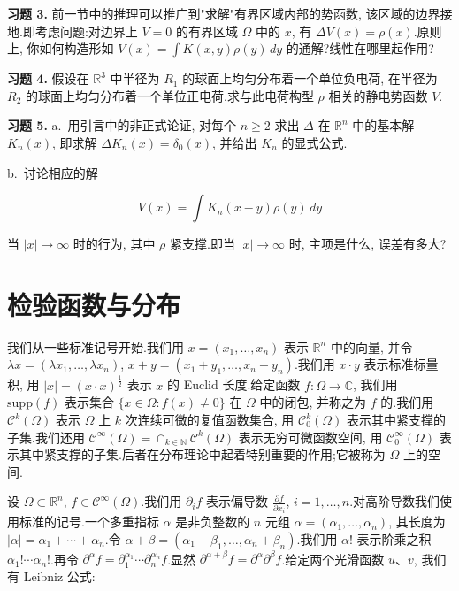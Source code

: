 \textbf{习题 3.} 前一节中的推理可以推广到"求解"有界区域内部的势函数, 该区域的边界接地.即考虑问题:对边界上 $V=0$ 的有界区域 $\Omega$ 中的 $x$, 有 $\Delta V(x) = \rho(x)$.原则上, 你如何构造形如 $V(x) = \int K(x, y)\rho(y)\, dy$ 的通解?线性在哪里起作用?

\textbf{习题 4.} 假设在 $\mathbb{R}^3$ 中半径为 $R_1$ 的球面上均匀分布着一个单位负电荷, 在半径为 $R_2$ 的球面上均匀分布着一个单位正电荷.求与此电荷构型 $\rho$ 相关的静电势函数 $V$.

\textbf{习题 5.} a.~用引言中的非正式论证, 对每个 $n\geq 2$ 求出 $\Delta$ 在 $\mathbb{R}^n$ 中的基本解 $K_n(x)$, 即求解 $\Delta K_n(x) = \delta_0(x)$, 并给出 $K_n$ 的显式公式.

b.~讨论相应的解

\[
V(x) = \int K_n(x-y)\rho(y)\, dy
\]

当 $|x|\to\infty$ 时的行为, 其中 $\rho$ 紧支撑.即当 $|x|\to\infty$ 时, 主项是什么, 误差有多大?

\section{检验函数与分布}

我们从一些标准记号开始.我们用 $x = (x_1, \ldots, x_n)$ 表示 $\mathbb{R}^n$ 中的向量, 并令 $\lambda x = (\lambda x_1, \ldots, \lambda x_n)$, $x+y = (x_1+y_1, \ldots, x_n+y_n)$.我们用 $x\cdot y$ 表示标准标量积, 用 $|x| = (x\cdot x)^{\frac{1}{2}}$ 表示 $x$ 的 Euclid 长度.给定函数 $f : \Omega\to\mathbb{C}$, 我们用 $\mathrm{supp}(f)$ 表示集合 $\{x\in\Omega : f(x)\neq 0\}$ 在 $\Omega$ 中的闭包, 并称之为 $f$ 的.我们用 $\mathcal{C}^k(\Omega)$ 表示 $\Omega$ 上 $k$ 次连续可微的复值函数集合, 用 $\mathcal{C}_0^k(\Omega)$ 表示其中紧支撑的子集.我们还用 $\mathcal{C}^{\infty}(\Omega) = \cap_{k\in\mathbb{N}}\mathcal{C}^k(\Omega)$ 表示无穷可微函数空间, 用 $\mathcal{C}_0^{\infty}(\Omega)$ 表示其中紧支撑的子集.后者在分布理论中起着特别重要的作用;它被称为 $\Omega$ 上的空间.

设 $\Omega\subset\mathbb{R}^n$, $f\in\mathcal{C}^{\infty}(\Omega)$.我们用 $\partial_i f$ 表示偏导数 $\frac{\partial f}{\partial x_i}$, $i = 1, \ldots, n$.对高阶导数我们使用标准的记号.一个多重指标 $\alpha$ 是非负整数的 $n$ 元组 $\alpha = (\alpha_1, \ldots, \alpha_n)$, 其长度为 $|\alpha| = \alpha_1+\cdots+\alpha_n$.令 $\alpha+\beta = (\alpha_1+\beta_1, \ldots, \alpha_n+\beta_n)$.我们用 $\alpha!$ 表示阶乘之积 $\alpha_1!\cdots\alpha_n!$.再令 $\partial^{\alpha}f = \partial_1^{\alpha_1}\cdots\partial_n^{\alpha_n}f$.显然 $\partial^{\alpha+\beta}f = \partial^{\alpha}\partial^{\beta}f$.给定两个光滑函数 $u$、$v$, 我们有 Leibniz 公式:

